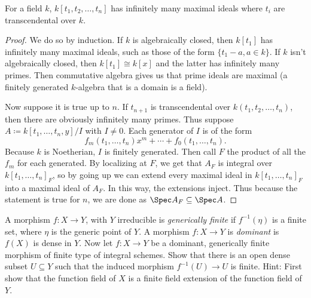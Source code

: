 \begin{lem}\label{lem:infinite_primes}
	For a field $k $, $k[t_{1},t_{2},\ldots,t_n] $ has infinitely many maximal ideals where $t_i $ are transcendental over $k $.
\end{lem}
\begin{proof}
	We do so by induction.
	If $k $ is algebraically closed, then $k[t_{1}] $ has infinitely many maximal ideals, such as those of the form $\{t_{1}-a,a\in k\}  $.
	If $k $ isn't algebraically closed, then $k[t_{1}]\cong k[x] $ and the latter has infinitely many primes.
	Then commutative algebra gives us that prime ideals are maximal (a finitely generated $k $-algebra that is a domain is a field).

	Now suppose it is true up to $n $.
	If $t_{n+1} $ is transcendental over $k(t_{1},t_{2},\ldots,t_n) $, then there are obviously infinitely many primes.
	Thus suppose $A \coloneqq k[t_{1},\ldots,t_{n}, y] / I$ with $I \ne 0 $.
	Each generator of $I $ is of the form
	\[
		f_m(t_{1},\ldots,t_n) x^m + \cdots + f_{0}(t_{1},\ldots,t_n)
	.\] 
	Because $k $ is Noetherian, $I $ is finitely generated.
	Then call $F $ the product of all the $f_m $ for each generated.
	By localizing at $F $, we get that $A_{F}$ is integral over $k[t_{1},\ldots,t_n]_F $, so by going up we can extend every maximal ideal in $k[t_{1},\ldots,t_n]_F$ into a maximal ideal of $A_F$.
	In this way, the extensions inject.
	Thus because the statement is true for $n $, we are done as $\Spec A_F \subseteq \Spec A $.
\end{proof}
\begin{exercise}%
	A morphism $f: X\to Y $, with $Y $ irreducible is \textit{generically finite} if $f^{-1}(\eta ) $ is a finite set, where $\eta  $ is the generic point of $Y $. A morphism $f: X\to Y $ is \textit{dominant} is $f(X) $ is dense in $Y $. Now let $f: X\to Y $ be a dominant, generically finite morphism of finite type of integral schemes. Show that there is an open dense subset $U \subseteq Y $ such that the induced morphism $f^{-1}(U) \to U $ is finite.
	\ifhint
		Hint: First show that the function field of $X $ is a finite field extension of the function field of $Y $.
	\fi
\end{exercise}
